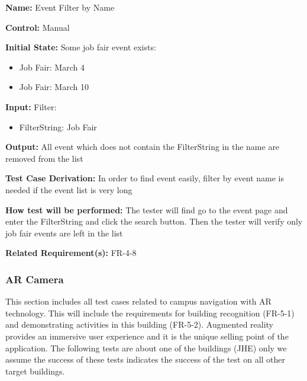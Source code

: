 \documentclass[12pt, titlepage]{article}
\begin{document}
\begin{enumerate}
\textbf{Name:} Event Filter by Name

\textbf{Control:} Manual
					
\textbf{Initial State:} Some job fair event exists:
\begin{itemize}
\item Job Fair: March 4
\item Job Fair: March 10
\end{itemize}

\textbf{Input:} Filter:
\begin{itemize}
\item FilterString: Job Fair
\end{itemize}
					
\textbf{Output:} All event which does not contain the FilterString in the name are removed from the list

\textbf{Test Case Derivation:} In order to find event easily, filter by event name is needed if the event list is very long
					
\textbf{How test will be performed:} The tester will find go to the event page and enter the FilterString and click the search button. Then the tester will verify only job fair events are left in the list

\textbf{Related Requirement(s):} FR-4-8
\end{enumerate}

\subsubsection{AR Camera}

This section includes all test cases related to campus navigation with AR technology. This will include the requirements for building recognition (FR-5-1) and demonstrating activities in this building (FR-5-2). Augmented reality provides an immersive user experience and it is the unique selling point of the application. The following tests are about one of the buildings (JHE) only we assume the success of these tests indicates the success of the test on all other target buildings.
\end{document}
